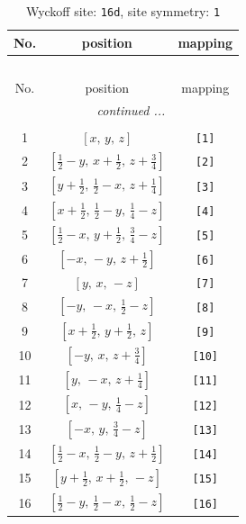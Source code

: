 \documentclass[fleqn,8pt]{jsarticle}
\begin{document}
\begin{longtable}{ccc}
\caption{Wyckoff site: {\tt 16d}, site symmetry: {\tt 1}}
 \\
 \hline \hline
No. & position & mapping \\ \hline \endfirsthead

\multicolumn{2}{l}{\tablename\ \thetable{}} \\
 \hline \hline
No. & position & mapping \\ \hline \endhead

 \hline \hline
\multicolumn{2}{r}{\footnotesize\it continued ...} \\ \endfoot

 \hline \hline
\multicolumn{2}{r}{} \\ \endlastfoot

1 & $\left[ x,\, y,\, z \right]$ & {\tt [1]} \\ \hline
2 & $\left[ \frac{1}{2} - y,\, x + \frac{1}{2},\, z + \frac{3}{4} \right]$ & {\tt [2]} \\ \hline
3 & $\left[ y + \frac{1}{2},\, \frac{1}{2} - x,\, z + \frac{1}{4} \right]$ & {\tt [3]} \\ \hline
4 & $\left[ x + \frac{1}{2},\, \frac{1}{2} - y,\, \frac{1}{4} - z \right]$ & {\tt [4]} \\ \hline
5 & $\left[ \frac{1}{2} - x,\, y + \frac{1}{2},\, \frac{3}{4} - z \right]$ & {\tt [5]} \\ \hline
6 & $\left[ - x,\, - y,\, z + \frac{1}{2} \right]$ & {\tt [6]} \\ \hline
7 & $\left[ y,\, x,\, - z \right]$ & {\tt [7]} \\ \hline
8 & $\left[ - y,\, - x,\, \frac{1}{2} - z \right]$ & {\tt [8]} \\ \hline
9 & $\left[ x + \frac{1}{2},\, y + \frac{1}{2},\, z \right]$ & {\tt [9]} \\ \hline
10 & $\left[ - y,\, x,\, z + \frac{3}{4} \right]$ & {\tt [10]} \\ \hline
11 & $\left[ y,\, - x,\, z + \frac{1}{4} \right]$ & {\tt [11]} \\ \hline
12 & $\left[ x,\, - y,\, \frac{1}{4} - z \right]$ & {\tt [12]} \\ \hline
13 & $\left[ - x,\, y,\, \frac{3}{4} - z \right]$ & {\tt [13]} \\ \hline
14 & $\left[ \frac{1}{2} - x,\, \frac{1}{2} - y,\, z + \frac{1}{2} \right]$ & {\tt [14]} \\ \hline
15 & $\left[ y + \frac{1}{2},\, x + \frac{1}{2},\, - z \right]$ & {\tt [15]} \\ \hline
16 & $\left[ \frac{1}{2} - y,\, \frac{1}{2} - x,\, \frac{1}{2} - z \right]$ & {\tt [16]} \\
\end{longtable}
\end{document}
